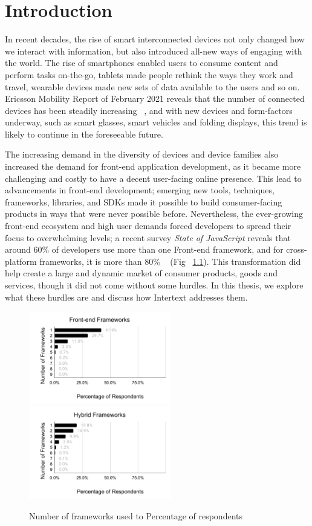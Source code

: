 
\chapter{Introduction}

In recent decades, the rise of smart interconnected devices not only changed how we interact with information, but also introduced all-new ways of engaging with the world. The rise of smartphones enabled users to consume content and perform tasks on-the-go, tablets made people rethink the ways they work and travel, wearable devices made new sets of data available to the users and so on. Ericsson Mobility Report of February 2021 reveals that the number of connected devices has been steadily increasing ~\cite{EricssonMobility2020}, and with new devices and form-factors underway, such as smart glasses, smart vehicles and folding displays, this trend is likely to continue in the foreseeable future. 

The increasing demand in the diversity of devices and device families also increased the demand for front-end application development, as it became more challenging and costly to have a decent user-facing online presence. This lead to advancements in front-end development; emerging new tools, techniques, frameworks, libraries, and SDKs made it possible to build consumer-facing products in ways that were never possible before. Nevertheless, the ever-growing front-end ecosystem and high user demands forced developers to spread their focus to overwhelming levels; a recent survey \textit{State of JavaScript} reveals that around 60\% of developers use more than one Front-end framework, and for cross-platform frameworks, it is more than 80\% ~\cite{StateOfJs2020} (Fig ~\ref{fig:num_of_frameworks_used}). This transformation did help create a large and dynamic market of consumer products, goods and services, though it did not come without some hurdles. In this thesis, we explore what these hurdles are and discuss how Intertext addresses them.

\begin{figure}
  \centering
  \includegraphics[width=6.2cm]{images/sojs1.pdf}
  \,
  \includegraphics[width=6.2cm]{images/sojs2.pdf}
  \caption{Number of frameworks used to Percentage of respondents}%
  \label{fig:num_of_frameworks_used}%
\end{figure}





